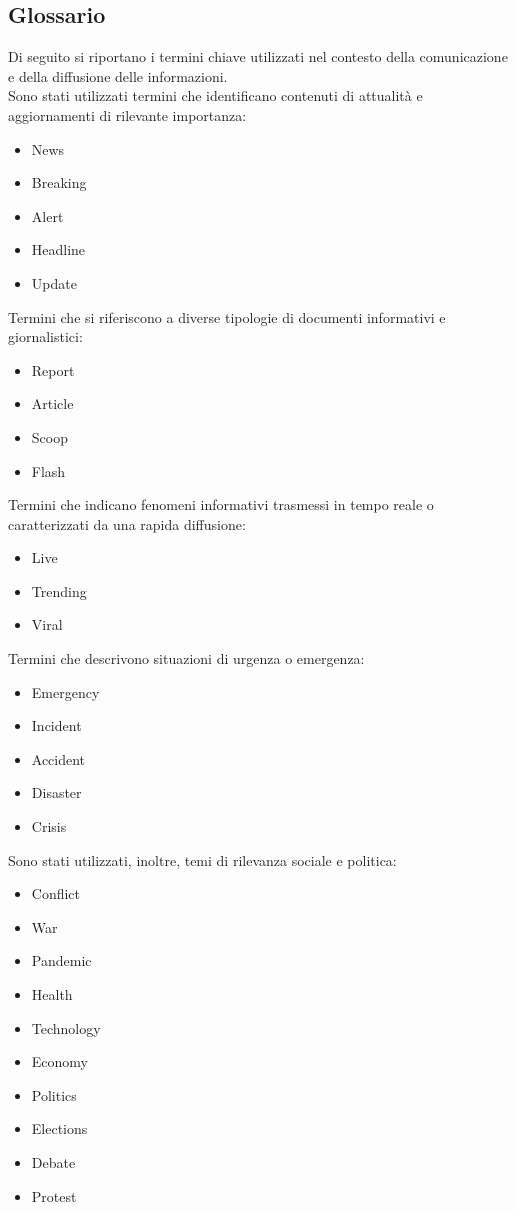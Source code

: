\documentclass[12pt]{article}
\begin{document}
	\subsection{Glossario}
		Di seguito si riportano i termini chiave utilizzati nel contesto della comunicazione e della diffusione delle informazioni.\\
		Sono stati utilizzati termini che identificano contenuti di attualità e aggiornamenti di rilevante importanza:
	\begin{itemize}[label=] 
		\item News
		\item Breaking
		\item Alert
		\item Headline
		\item Update
	\end{itemize}
	Termini che si riferiscono a diverse tipologie di documenti informativi e giornalistici:
	\begin{itemize}[label=] 
		\item Report
		\item Article
		\item Scoop
		\item Flash
	\end{itemize}
	Termini che indicano fenomeni informativi trasmessi in tempo reale o caratterizzati da una rapida diffusione:
	\begin{itemize}[label=] 
		\item Live
		\item Trending
		\item Viral
	\end{itemize}
	Termini che descrivono situazioni di urgenza o emergenza:
	\begin{itemize}[label=] 
		\item Emergency
		\item Incident
		\item Accident
		\item Disaster
		\item Crisis
	\end{itemize}
	Sono stati utilizzati, inoltre, temi di rilevanza sociale e politica:
	\begin{itemize}[label=] 
		\item Conflict
		\item War
		\item Pandemic
		\item Health
		\item Technology
		\item Economy
		\item Politics
		\item Elections
		\item Debate
		\item Protest
	\end{itemize}
\end{document}
